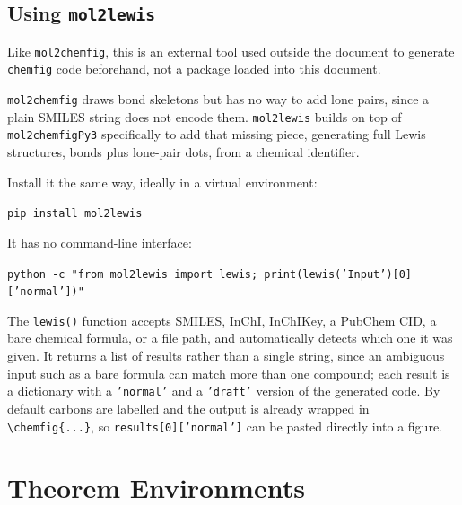	\subsection{Using \texttt{mol2lewis}}
	\noindent\colorbox{themecolour!15}{\parbox{\linewidth}{\small Like \texttt{mol2chemfig}, this is an external tool used outside the document to generate \texttt{chemfig} code beforehand, not a package loaded into this document.}}\vspace{0.5\baselineskip}
	
	\texttt{mol2chemfig} draws bond skeletons but has no way to add lone pairs, since a plain SMILES string does not encode them. \texttt{mol2lewis} builds on top of \texttt{mol2chemfigPy3} specifically to add that missing piece, generating full Lewis structures, bonds plus lone-pair dots, from a chemical identifier.
	
	Install it the same way, ideally in a virtual environment:
	
	\vspace{16pt}\noindent\texttt{pip install mol2lewis}\vspace{16pt}
	
	It has no command-line interface:
	
	\vspace{16pt}\noindent\texttt{python -c "from mol2lewis import lewis; print(lewis('\textcolor{themecolour}{Input}')[0]['normal'])"}\vspace{16pt}
	
	The \texttt{lewis()} function accepts SMILES, InChI, InChIKey, a PubChem CID, a bare chemical formula, or a file path, and automatically detects which one it was given. It returns a list of results rather than a single string, since an ambiguous input such as a bare formula can match more than one compound; each result is a dictionary with a \texttt{'normal'} and a \texttt{'draft'} version of the generated code. By default carbons are labelled and the output is already wrapped in \texttt{\textbackslash chemfig\{...\}}, so \texttt{results[0]['normal']} can be pasted directly into a figure.

\section{Theorem Environments}

